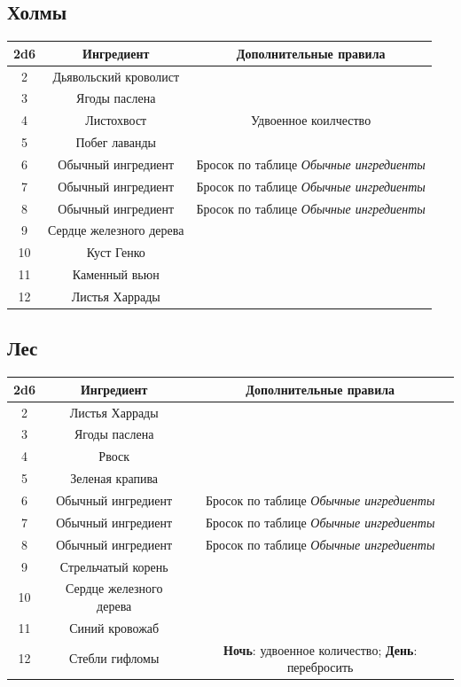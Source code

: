 \documentclass[a4paper, 9pt, twocolumn]{book}
\begin{document}
\subsection{Холмы}

	\begin{tabular}{|c|c|c|}
		\hline
		\textbf{2d6}& \textbf{Ингредиент} & Дополнительные правила \\
		\hline
		2 & Дьявольский кроволист &  \\
		\hline
		3 & Ягоды паслена &  \\
		\hline
		4 & Листохвост & Удвоенное коилчество \\
		\hline
		5 & Побег лаванды &  \\
		\hline
		6 & Обычный ингредиент & Бросок по таблице \textit{Обычные ингредиенты} \\
		\hline
		7 & Обычный ингредиент & Бросок по таблице \textit{Обычные ингредиенты} \\
		\hline
		8 & Обычный ингредиент & Бросок по таблице \textit{Обычные ингредиенты} \\
		\hline
		9 & Сердце железного дерева &  \\
		\hline
		10 & Куст Генко  &  \\
		\hline
		11 & Каменный вьюн &  \\
		\hline
		12 & Листья Харрады &  \\
		\hline
	\end{tabular}

\subsection{Лес}

	\begin{tabular}{|c|c|c|}
		\hline
		\textbf{2d6} & \textbf{Ингредиент} & \textbf{Дополнительные правила} \\
		\hline
		2 & Листья Харрады &  \\
		\hline
		3 & Ягоды паслена &  \\
		\hline
		4 & Рвоск &  \\
		\hline
		5 & Зеленая крапива &  \\
		\hline
		6 & Обычный ингредиент & Бросок по таблице \textit{Обычные ингредиенты} \\
		\hline
		7 & Обычный ингредиент & Бросок по таблице \textit{Обычные ингредиенты} \\
		\hline
		8 & Обычный ингредиент & Бросок по таблице \textit{Обычные ингредиенты} \\
		\hline
		9 & Стрельчатый корень &  \\
		\hline
		10 & Сердце железного дерева &  \\
		\hline
		11 & Синий кровожаб &  \\
		\hline
		12 & Стебли гифломы & \textbf{Ночь}: удвоенное количество; \textbf{День}: перебросить \\
		\hline
	\end{tabular}
\end{document}
